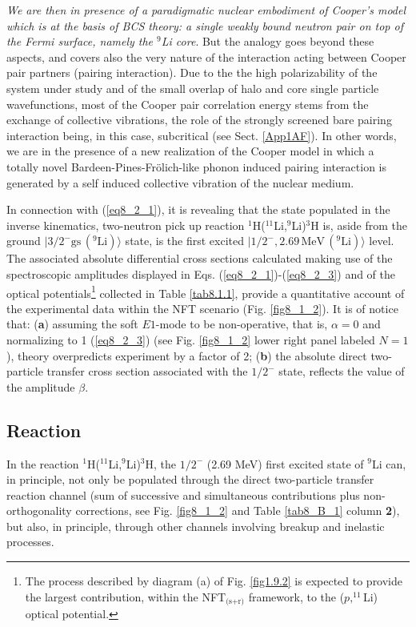 \textit{We are then in presence of a paradigmatic nuclear embodiment of Cooper's model which is at the basis of BCS theory: a single weakly bound neutron pair on top of the Fermi surface, namely the  ${}^9$Li core}. But the analogy goes beyond these aspects, and covers also the very nature of the interaction acting between Cooper pair partners  (pairing interaction). Due to the  the high polarizability of the system under study and of the small overlap of halo and core single particle wavefunctions, most of the Cooper pair correlation energy stems from the exchange of collective vibrations, the role of the strongly screened bare pairing interaction being, in this case, subcritical  (see Sect. \ref{App1AF}). In other words, we are in the presence of a new realization of the Cooper model in which a totally novel Bardeen-Pines-Fr\"olich-like phonon induced pairing interaction is generated by a self induced collective vibration of the nuclear medium.



 In connection with  (\ref{eq8_2_1}), it is revealing that the  state populated in the  inverse kinematics, two-neutron pick up reaction $^1$H($^{11}$Li,$^9$Li)$^3$H is, aside from the ground $|3/2^-\text{gs}\,(^9\text{Li})\rangle$ state, is  the first excited $|1/2^-,2.69\,\text{MeV}\,(^9\text{Li})\rangle$ level. The associated absolute differential cross sections calculated making use of the spectroscopic amplitudes displayed in Eqs. (\ref{eq8_2_1})-(\ref{eq8_2_3}) and of the optical potentials\footnote{The process described by diagram (a) of Fig. \ref{fig1.9.2} is expected to provide the largest contribution, within the NFT$_{\text{(s+r)}}$ framework, to the ($p,^{11}$Li) optical potential.} collected in Table \ref{tab8.1.1}, provide a quantitative account of the experimental data  within the NFT scenario (Fig. \ref{fig8_1_2}). It is of notice that: (\textbf{a}) assuming the soft $E1$-mode to be non-operative, that is, $\alpha=0$ and normalizing to 1 (\ref{eq8_2_3}) (see Fig. \ref{fig8_1_2} lower right panel labeled $N=1$), theory overpredicts experiment by a factor of 2; (\textbf{b}) the absolute direct two-particle transfer cross section associated with the $1/2^-$ state, reflects the value of the amplitude $\beta$. 
 
 
 
 
 
 \subsection{Reaction}\label{C8AppB}
 In the reaction $^1$H($^{11}$Li,$^9$Li)$^3$H,
 the $1/2^-$ (2.69 MeV) first excited state of $^9$Li can, in principle, not only be populated through the direct two-particle transfer reaction channel (sum of successive and simultaneous contributions plus non-orthogonality corrections, see Fig. \ref{fig8_1_2} and Table \ref{tab8_B_1} column \textbf{2}), but also, in principle, through other channels involving breakup and inelastic processes.
 

